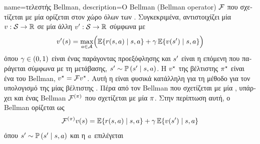 {name={\foreignlanguage{greek}{τελεστής} Bellman},
	description={\foreignlanguage{greek}{Ο}  Bellman 
		(Bellman operator) $\mathcal{F}$ \foreignlanguage{greek}{που σχετίζεται με μία}  
		\foreignlanguage{greek}{ορίζεται στον χώρο όλων των} . 
		\foreignlanguage{greek}{Συγκεκριμένα, αντιστοιχίζει μία}  
		$v: \mathcal{S} \rightarrow \mathbb{R}$ \foreignlanguage{greek}{σε μία άλλη}
		 $v': \mathcal{S} \rightarrow \mathbb{R}$ 
		\foreignlanguage{greek}{σύμφωνα με} 
		\[
		       	v'(s) =\max_{a \in \mathcal{A}}
			\Bigl(
			\mathbb{E}\{ r(s,a)\mid s,a \}
			+ \gamma \, \mathbb{E}\{ v(s') \mid s,a \}
			\Bigr)
		\]
		\foreignlanguage{greek}{όπου $\gamma \in (0,1)$ είναι ένας παράγοντας προεξόφλησης και 
		$s'$ είναι η επόμενη}  \foreignlanguage{greek}{που παράγεται σύμφωνα με τη} 
		 \foreignlanguage{greek}{μετάβασης}, $s' \sim \mathbb{P}\left(s' \mid s,a\right)$.
		\foreignlanguage{greek}{Η}  $v^\star$ \foreignlanguage{greek}{της βέλτιστης}
		 $\pi^\star$ \foreignlanguage{greek}{είναι ένα}  \foreignlanguage{greek}{του} 
		 Bellman, $v^\star = \mathcal{F} v^\star$. \foreignlanguage{greek}{Αυτή η} 
		 \foreignlanguage{greek}{είναι φυσικά κατάλληλη για τη} \foreignlanguage{greek}{μέθοδο}
		 \foreignlanguage{greek}{για τον υπολογισμό της}  
		\foreignlanguage{greek}{μίας βέλτιστης} . \foreignlanguage{greek}{Πέρα από τον}  
		Bellman \foreignlanguage{greek}{που σχετίζεται με μία} , \foreignlanguage{greek}{υπάρχει και ένας} 
		 Bellman $\mathcal{F}^{(\pi)}$ \foreignlanguage{greek}{που σχετίζεται με μία} 
		 $\pi$. \foreignlanguage{greek}{Στην περίπτωση αυτή, ο}  Bellman 
		\foreignlanguage{greek}{ορίζεται ως}
		\[
			\mathcal{F}^{(\pi)} v(s) = \mathbb{E}\{ r(s,a) \mid s,a \}
			+ \gamma \, \mathbb{E}\{ v(s') \mid s,a \}
		\]
		\foreignlanguage{greek}{όπου $s' \sim \mathbb{P}\left(s' \mid s,a\right)$ και η $a$ επιλέγεται
}}}
